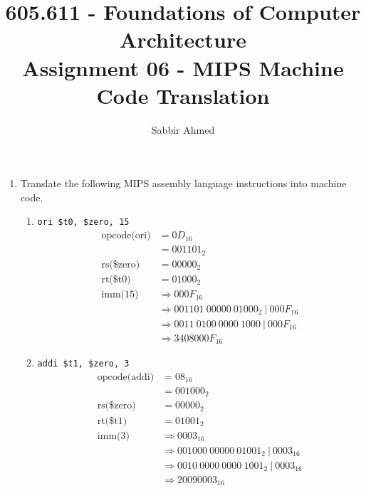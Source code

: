 \documentclass[12pt]{article}
\begin{document}
  \title{605.611 - Foundations of Computer Architecture \\ Assignment 06 - MIPS Machine Code Translation\vspace{-0.5em}}
  \author{Sabbir Ahmed}
  \maketitle
  \vspace{-1em}

  \begin{enumerate}

    \item Translate the following MIPS assembly language instructions into machine code.

    \begin{enumerate}

      \item \texttt{ori \$t0, \$zero, 15}
      \begin{align*}
        \text{opcode(ori)} &= 0D_{16} \\
        &= 001101_2\\
        \text{rs(\$zero)} &= 00000_2 \\
        \text{rt(\$t0)} &= 01000_2 \\
        \text{imm(15)} &\Rightarrow 000F_{16}\\
        &\Rightarrow 001101 \ 00000 \ 01000_2 \ | \ 000F_{16}\\
        &\Rightarrow 0011 \ 0100 \ 0000 \ 1000 \ | \ 000F_{16}\\
        &\Rightarrow 3408000F_{16}
      \end{align*}

      \item \texttt{addi \$t1, \$zero, 3}
      \begin{align*}
        \text{opcode(addi)} &= 08_{16} \\
        &= 001000_2\\
        \text{rs(\$zero)} &= 00000_2 \\
        \text{rt(\$t1)} &= 01001_2 \\
        \text{imm(3)} &\Rightarrow 0003_{16}\\
        &\Rightarrow 001000 \ 00000 \ 01001_2 \ | \ 0003_{16}\\
        &\Rightarrow 0010 \ 0000 \ 0000 \ 1001_2 \ | \ 0003_{16}\\
        &\Rightarrow 20090003_{16}
      \end{align*}


\end{enumerate}
\end{enumerate}
\end{document}
